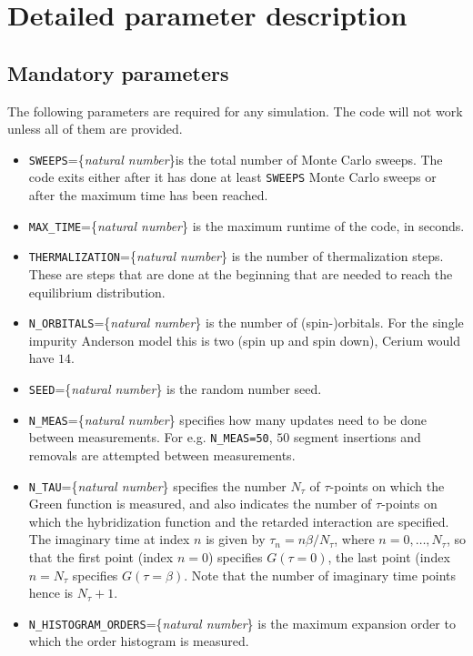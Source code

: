 \documentclass[aps,prb,floatfix,superscriptaddress,twocolumn,notitlepage]{revtex4-1}
\begin{document}
\section{Detailed parameter description}

\subsection{Mandatory parameters}
The following parameters are required for any simulation. The code will not work unless all of them are provided.

\begin{itemize}
\item \verb#SWEEPS#=\{\emph{natural number}\}is the total number of Monte Carlo sweeps. The code exits either after it has done at least \verb#SWEEPS# Monte Carlo sweeps or after the maximum time has been reached.
\item \verb#MAX_TIME#=\{\emph{natural number}\} is the maximum runtime of the code, in seconds.
\item \verb#THERMALIZATION#=\{\emph{natural number}\} is the number of thermalization steps. These are steps that are done at the beginning that are needed to reach the equilibrium distribution.
\item \verb#N_ORBITALS#=\{\emph{natural number}\} is the number of (spin-)orbitals. For the single impurity Anderson model this is two (spin up and spin down), Cerium would have $14$.
\item \verb#SEED#=\{\emph{natural number}\} is the random number seed. 
\item \verb#N_MEAS#=\{\emph{natural number}\} specifies how many updates need to be done between measurements. For e.g. \verb#N_MEAS=50#, $50$ segment insertions and removals are attempted between measurements.
\item \verb#N_TAU#=\{\emph{natural number}\} specifies the number $N_{\tau}$ of $\tau$-points on which the Green function is measured, and also indicates the number of $\tau$-points on which the hybridization function and the retarded interaction are specified. The imaginary time at index $n$ is given by $\tau_{n}=n\beta/N_{\tau}$, where $n=0,\ldots,N_{\tau}$, so that the first point (index $n=0$) specifies $G(\tau=0)$, the last point (index $n=N_{\tau}$ specifies $G(\tau=\beta)$. Note that the number of imaginary time points hence is $N_{\tau}+1$.
\item \verb#N_HISTOGRAM_ORDERS#=\{\emph{natural number}\} is the maximum expansion order to which the order histogram is measured. 

\end{itemize}
\end{document}
